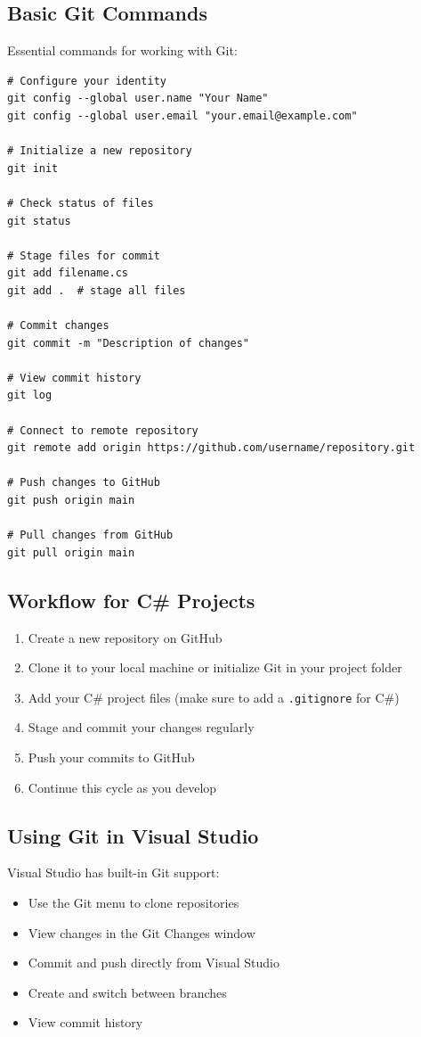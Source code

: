 \documentclass{article}
\begin{document}
\subsection{Basic Git Commands}
Essential commands for working with Git:

\begin{verbatim}
# Configure your identity
git config --global user.name "Your Name"
git config --global user.email "your.email@example.com"

# Initialize a new repository
git init

# Check status of files
git status

# Stage files for commit
git add filename.cs
git add .  # stage all files

# Commit changes
git commit -m "Description of changes"

# View commit history
git log

# Connect to remote repository
git remote add origin https://github.com/username/repository.git

# Push changes to GitHub
git push origin main

# Pull changes from GitHub
git pull origin main
\end{verbatim}

\subsection{Workflow for C\# Projects}
\begin{enumerate}
    \item Create a new repository on GitHub
    \item Clone it to your local machine or initialize Git in your project folder
    \item Add your C\# project files (make sure to add a \texttt{.gitignore} for C\#)
    \item Stage and commit your changes regularly
    \item Push your commits to GitHub
    \item Continue this cycle as you develop
\end{enumerate}

\subsection{Using Git in Visual Studio}
Visual Studio has built-in Git support:
\begin{itemize}
    \item Use the Git menu to clone repositories
    \item View changes in the Git Changes window
    \item Commit and push directly from Visual Studio
    \item Create and switch between branches
    \item View commit history
\end{itemize}
\end{document}
